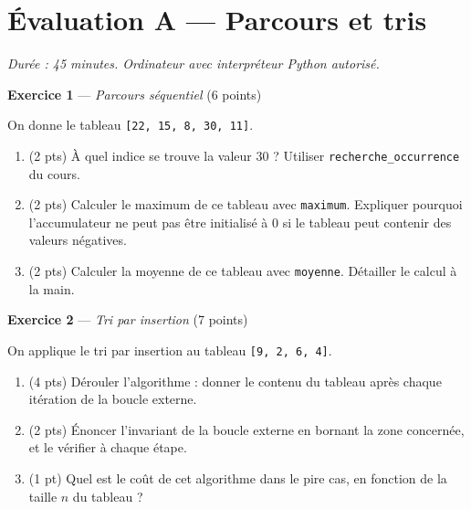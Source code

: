 \section*{Évaluation A --- Parcours et tris}
\textit{Durée : 45 minutes. Ordinateur avec interpréteur Python autorisé.}


\bigskip

\textbf{Exercice 1} --- \textit{Parcours séquentiel} \hfill (6 points)

On donne le tableau \lstinline{[22, 15, 8, 30, 11]}.

\begin{enumerate}
  \item (2 pts) À quel indice se trouve la valeur $30$ ? Utiliser \lstinline{recherche_occurrence} du cours.
  \item (2 pts) Calculer le maximum de ce tableau avec \lstinline{maximum}. Expliquer pourquoi l'accumulateur ne peut pas être initialisé à $0$ si le tableau peut contenir des valeurs négatives.
  \item (2 pts) Calculer la moyenne de ce tableau avec \lstinline{moyenne}. Détailler le calcul à la main.
\end{enumerate}

\bigskip

\textbf{Exercice 2} --- \textit{Tri par insertion} \hfill (7 points)

On applique le tri par insertion au tableau \lstinline{[9, 2, 6, 4]}.

\begin{enumerate}
  \item (4 pts) Dérouler l'algorithme : donner le contenu du tableau après chaque itération de la boucle externe.
  \item (2 pts) Énoncer l'invariant de la boucle externe en bornant la zone concernée, et le vérifier à chaque étape.
  \item (1 pt) Quel est le coût de cet algorithme dans le pire cas, en fonction de la taille $n$ du tableau ?
\end{enumerate}

